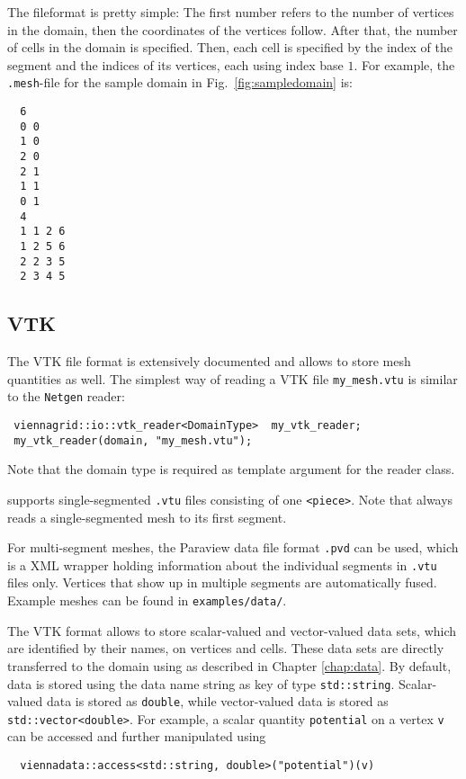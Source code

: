  The fileformat is pretty simple: The first number refers to the number of vertices in the domain, then the coordinates of the vertices follow. After that, the number of cells in the domain is specified. Then, each cell is specified by the index of the segment and the indices of its vertices, each using index base $1$.
 For example, the \texttt{.mesh}-file for the sample domain in Fig.~\ref{fig:sampledomain} is:
 \begin{verbatim}
  6
  0 0
  1 0
  2 0
  2 1
  1 1
  0 1
  4
  1 1 2 6
  1 2 5 6
  2 2 3 5
  2 3 4 5
 \end{verbatim}

 \subsection{VTK}
 The VTK file format is extensively documented \cite{VTKfileformat} and allows to store mesh quantities as well.
 The simplest way of reading a VTK file \lstinline|my_mesh.vtu| is similar to the \texttt{Netgen} reader:
 \begin{lstlisting}
 viennagrid::io::vtk_reader<DomainType>  my_vtk_reader;
 my_vtk_reader(domain, "my_mesh.vtu");
 \end{lstlisting}
 Note that the domain type is required as template argument for the reader class.

 {\ViennaGrid} supports single-segmented \lstinline|.vtu| files consisting of one \lstinline|<piece>|.
 Note that {\ViennaGrid} always reads a single-segmented mesh to its first segment.

 For multi-segment meshes, the Paraview \cite{paraview} data file format \lstinline|.pvd| can be used, which is a XML wrapper holding information about the individual segments in \lstinline|.vtu| files only. Vertices that show up in multiple segments are automatically fused. Example meshes can be found in \texttt{examples/data/}.


 The VTK format allows to store scalar-valued and vector-valued data sets, which are identified by their names, on vertices and cells.
 These data sets are directly transferred to the {\ViennaGrid} domain using {\ViennaData} as described in Chapter \ref{chap:data}.
 By default, data is stored using the data name string as key of type \lstinline|std::string|.
 Scalar-valued data is stored as \lstinline|double|, while vector-valued data is stored as \lstinline|std::vector<double>|.
 For example, a scalar quantity \texttt{potential} on a vertex \lstinline|v| can be accessed and further manipulated using
 \begin{lstlisting}
  viennadata::access<std::string, double>("potential")(v)
 \end{lstlisting}

